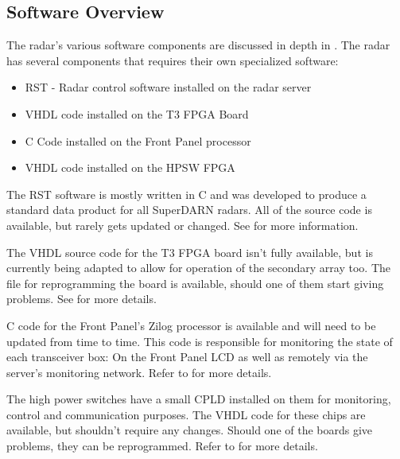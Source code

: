 \subsection{Software Overview}
\label{subsec:intro_sw}
The radar's various software components are discussed in depth in . The radar has several components that requires their own specialized software:
\begin{itemize}
	\item RST - Radar control software installed on the radar server
	\item VHDL code installed on the T3 FPGA Board
	\item C Code installed on the Front Panel processor
	\item VHDL code installed on the HPSW FPGA
\end{itemize}
\par
The RST software is mostly written in C and was developed to produce a standard data product for all SuperDARN radars. All of the source code is available, but rarely gets updated or changed. See  for more information.
\par
The VHDL source code for the T3 FPGA board isn't fully available, but is currently being adapted to allow for operation of the secondary array too. The file for reprogramming the board is available, should one of them start giving problems. See  for more details.
\par
C code for the Front Panel's Zilog processor is available and will need to be updated from time to time. This code is responsible for monitoring the state of each transceiver box: On the Front Panel LCD as well as remotely via the server's monitoring network. Refer to  for more details.
\par
The high power switches have a small CPLD installed on them for monitoring, control and communication purposes. The VHDL code for these chips are available, but shouldn't require any changes. Should one of the boards give problems, they can be reprogrammed. Refer to  for more details.

\clearpage

